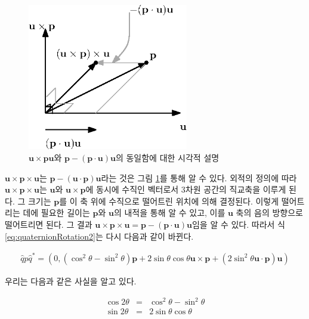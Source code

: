 \begin{figure}[h!]
  \centering
    \includegraphics[width=7cm]{Math_quaternion/uxpxu.eps}
    \caption{$\mathbf u \times \mathbf p \mathbf u$와 $\mathbf p - (\mathbf p \cdot \mathbf u) \mathbf u$의 동일함에 대한 시각적 설명}
    \label{fig:quaternion:uxpxu}
\end{figure}

$\mathbf u \times \mathbf p \times \mathbf u$는 $\mathbf p - (\mathbf u \cdot \mathbf p) \mathbf u$라는 것은
그림 \ref{fig:quaternion:uxpxu}를 통해 알 수 있다. 외적의 정의에 따라 $\mathbf u \times \mathbf p \times \mathbf u$는 $\mathbf u$와 $\mathbf u \times \mathbf p$에 동시에 수직인 벡터로서 3차원 공간의 직교축을 이루게 된다. 그 크기는 $\mathbf p$를 이 축 위에 수직으로 떨어트린 위치에 의해 결정된다.
이렇게 떨어트리는 데에 필요한 길이는 $\mathbf p$와 $\mathbf u$의 내적을 통해 알 수 있고, 이를 $\mathbf u$ 축의 음의 방향으로 떨어트리면 된다.
그 결과 $\mathbf u \times \mathbf p \times \mathbf u = \mathbf p - (\mathbf p \cdot \mathbf u) \mathbf u$임을 알 수 있다.
따라서 식 \ref{eq:quaternionRotation2}는 다시 다음과 같이 바뀐다.

\begin{eqnarray}
\hat q \hat p \hat q^* =  ( 0, (\cos^2 \theta - \sin^2 \theta ) \mathbf p + 2 \sin \theta \cos \theta \mathbf u \times \mathbf p + (2 \sin^2 \theta \mathbf u \cdot \mathbf p) \mathbf u )
\label{eq:quaternionRotation3}
\end{eqnarray}



우리는 다음과 같은 사실을 알고 있다.

\begin{eqnarray}
\cos 2 \theta  & = & \cos^2 \theta - \sin^2 \theta \\ \nonumber
\sin 2 \theta & = & 2 \sin \theta \cos \theta \\ \nonumber
\end{eqnarray}

